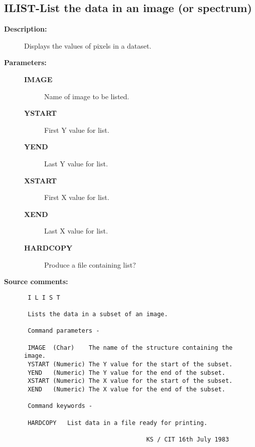 \subsection{ILIST-\label{ILIST}List the data in an image (or spectrum)}
\begin{description}

\item [{\bf Description:}]
 Displays the values of pixels in a dataset.

\item [{\bf Parameters:}]
\begin{description}
\item [{\bf IMAGE}]
 Name of image to be listed.
\item [{\bf YSTART}]
 First Y value for list.
\item [{\bf YEND}]
 Last Y value for list.
\item [{\bf XSTART}]
 First X value for list.
\item [{\bf XEND}]
 Last X value for list.
\item [{\bf HARDCOPY}]
 Produce a file containing list?
\end{description}

\item [{\bf Source comments:}]
\begin{verbatim}
 I L I S T

 Lists the data in a subset of an image.

 Command parameters -

 IMAGE  (Char)    The name of the structure containing the image.
 YSTART (Numeric) The Y value for the start of the subset.
 YEND   (Numeric) The Y value for the end of the subset.
 XSTART (Numeric) The X value for the start of the subset.
 XEND   (Numeric) The X value for the end of the subset.

 Command keywords -

 HARDCOPY   List data in a file ready for printing.

                                  KS / CIT 16th July 1983
\end{verbatim}
\end{description}
